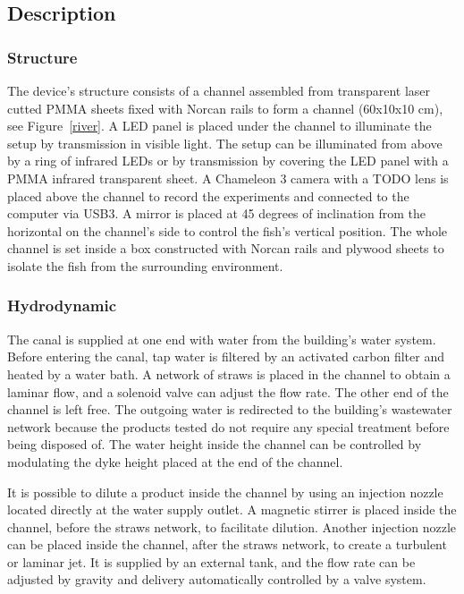 \subsection{Description}
  \subsubsection{Structure}
  The device's structure consists of a channel assembled from transparent laser cutted PMMA sheets fixed with Norcan rails to form a channel (60x10x10 cm), see Figure~\ref{river}. A LED panel is placed under the channel to illuminate the setup by transmission in visible light. The setup can be illuminated from above by a ring of infrared LEDs or by transmission by covering the LED panel with a PMMA infrared transparent sheet. A Chameleon 3 camera with a TODO lens is placed above the channel to record the experiments and connected to the computer via USB3. A mirror is placed at 45 degrees of inclination from the horizontal on the channel's side to control the fish's vertical position. The whole channel is set inside a box constructed with Norcan rails and plywood sheets to isolate the fish from the surrounding environment.

  \subsubsection{Hydrodynamic}
  The canal is supplied at one end with water from the building's water system. Before entering the canal, tap water is filtered by an activated carbon filter and heated by a water bath. A network of straws is placed in the channel to obtain a laminar flow, and a solenoid valve can adjust the flow rate. The other end of the channel is left free. The outgoing water is redirected to the building's wastewater network because the products tested do not require any special treatment before being disposed of. The water height inside the channel can be controlled by modulating the dyke height placed at the end of the channel.

  It is possible to dilute a product inside the channel by using an injection nozzle located directly at the water supply outlet. A magnetic stirrer is placed inside the channel, before the straws network, to facilitate dilution. Another injection nozzle can be placed inside the channel, after the straws network, to create a turbulent or laminar jet. It is supplied by an external tank, and the flow rate can be adjusted by gravity and delivery automatically controlled by a valve system.

